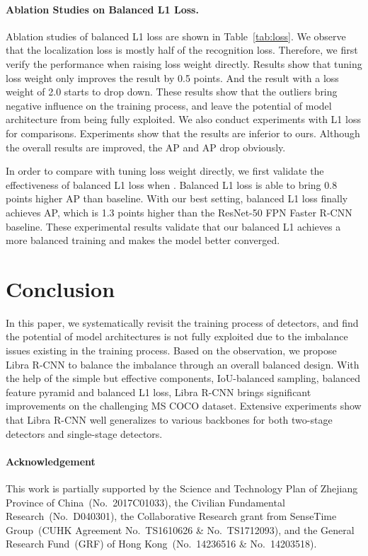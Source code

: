 \documentclass[10pt,twocolumn,letterpaper]{article}
\begin{document}
\paragraph{Ablation Studies on Balanced L1 Loss.}
Ablation studies of balanced L1 loss are shown in Table~\ref{tab:loss}.
We observe that the localization loss is mostly half of the recognition loss.
Therefore, we first verify the performance when raising loss weight directly.
Results show that tuning loss weight only improves the result by 0.5 points.
And the result with a loss weight of 2.0 starts to drop down.
These results show that the outliers bring negative influence on the training process, and leave the potential of model architecture from being fully exploited.
We also conduct experiments with L1 loss for comparisons.
Experiments show that the results are inferior to ours.
Although the overall results are improved, the AP and AP drop obviously.

In order to compare with tuning loss weight directly, we first validate the effectiveness of balanced L1 loss when .
Balanced L1 loss is able to bring 0.8 points higher AP than baseline.
With our best setting, balanced L1 loss finally achieves  AP, which is 1.3 points higher than the ResNet-50 FPN Faster R-CNN baseline.
These experimental results validate that our balanced L1 achieves a more balanced training and makes the model better converged.
 

\section{Conclusion}
In this paper, we systematically revisit the training process of detectors,
and find the potential of model architectures is not fully exploited due to the imbalance issues existing in the training process.
Based on the observation, we propose Libra R-CNN to balance the imbalance through an overall balanced design.
With the help of the simple but effective components, \ie IoU-balanced sampling, balanced feature pyramid and balanced L1 loss, Libra R-CNN brings significant improvements on the challenging MS COCO dataset.
Extensive experiments show that Libra R-CNN well generalizes to various backbones for both two-stage detectors and single-stage detectors.

\vspace{-10pt}
\paragraph{Acknowledgement}
This work is partially supported by
the Science and Technology Plan of Zhejiang Province of China~(No.~2017C01033),
the Civilian Fundamental Research~(No.~D040301),
the Collaborative Research grant from SenseTime Group~(CUHK Agreement No.~TS1610626 \& No.~TS1712093),
and the General Research Fund~(GRF) of Hong Kong~(No.~14236516 \& No.~14203518).
 
{\small


}
\end{document}

